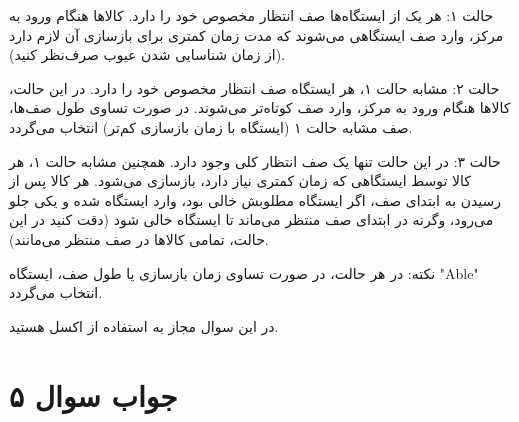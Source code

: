 حالت ۱: هر یک از ایستگاه‌ها صف انتظار مخصوص خود را دارد. کالاها هنگام ورود به مرکز، وارد صف ایستگاهی می‌شوند که مدت زمان کمتری برای بازسازی آن لازم دارد (از زمان شناسایی شدن عیوب صرف‌نظر کنید).

حالت ۲: مشابه حالت ۱، هر ایستگاه صف انتظار مخصوص خود را دارد. در این حالت، کالاها هنگام ورود به مرکز، وارد صف کوتاه‌تر می‌شوند. در صورت تساوی طول صف‌ها، صف مشابه حالت ۱ (ایستگاه با زمان بازسازی کم‌تر) انتخاب می‌گردد.

حالت ۳: در این حالت تنها یک صف انتظار کلی وجود دارد. همچنین مشابه حالت ۱، هر کالا توسط ایستگاهی که زمان کمتری نیاز دارد، بازسازی می‌شود. هر کالا پس از رسیدن به ابتدای صف، اگر ایستگاه مطلوبش خالی بود، وارد ایستگاه شده و یکی جلو می‌رود، وگرنه در ابتدای صف منتظر می‌ماند تا ایستگاه خالی شود (دقت کنید در این حالت، تمامی کالاها در صف منتظر می‌مانند).

نکته: در هر حالت، در صورت تساوی زمان بازسازی یا طول صف، ایستگاه "Able" انتخاب می‌گردد.

در این سوال مجاز به استفاده از اکسل هستید.

\section*{جواب سوال ۵}
 	